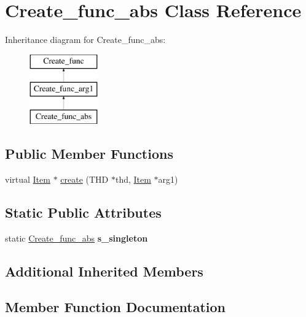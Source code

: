 \hypertarget{classCreate__func__abs}{}\section{Create\+\_\+func\+\_\+abs Class Reference}
\label{classCreate__func__abs}
Inheritance diagram for Create\+\_\+func\+\_\+abs\+:\begin{figure}[H]
\begin{center}
\leavevmode
\includegraphics[height=3.000000cm]{classCreate__func__abs}
\end{center}
\end{figure}
\subsection*{Public Member Functions}
\begin{DoxyCompactItemize}
\item 
virtual \mbox{\hyperlink{classItem}{Item}} $\ast$ \mbox{\hyperlink{classCreate__func__abs_ad4654de01a274ccb5f81dfec14549ca5}{create}} (T\+HD $\ast$thd, \mbox{\hyperlink{classItem}{Item}} $\ast$arg1)
\end{DoxyCompactItemize}
\subsection*{Static Public Attributes}
\begin{DoxyCompactItemize}
\item 
\mbox{\label{classCreate__func__abs_a00b0ade658afc550509a644da842d62d}} 
static \mbox{\hyperlink{classCreate__func__abs}{Create\+\_\+func\+\_\+abs}} {\bfseries s\+\_\+singleton}
\end{DoxyCompactItemize}
\subsection*{Additional Inherited Members}


\subsection{Member Function Documentation}
\mbox{\label{classCreate__func__abs_ad4654de01a274ccb5f81dfec14549ca5}} 

